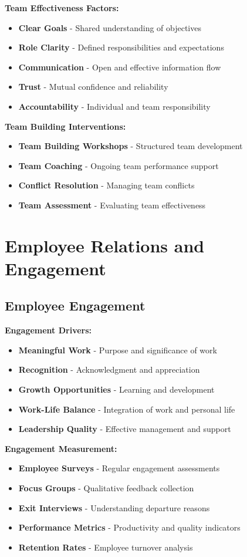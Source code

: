 \documentclass[12pt]{article}
\begin{document}
\textbf{Team Effectiveness Factors:}
\begin{itemize}
    \item \textbf{Clear Goals} - Shared understanding of objectives
    \item \textbf{Role Clarity} - Defined responsibilities and expectations
    \item \textbf{Communication} - Open and effective information flow
    \item \textbf{Trust} - Mutual confidence and reliability
    \item \textbf{Accountability} - Individual and team responsibility
\end{itemize}

\textbf{Team Building Interventions:}
\begin{itemize}
    \item \textbf{Team Building Workshops} - Structured team development
    \item \textbf{Team Coaching} - Ongoing team performance support
    \item \textbf{Conflict Resolution} - Managing team conflicts
    \item \textbf{Team Assessment} - Evaluating team effectiveness
\end{itemize}

\section{Employee Relations and Engagement}

\subsection{Employee Engagement}

\textbf{Engagement Drivers:}
\begin{itemize}
    \item \textbf{Meaningful Work} - Purpose and significance of work
    \item \textbf{Recognition} - Acknowledgment and appreciation
    \item \textbf{Growth Opportunities} - Learning and development
    \item \textbf{Work-Life Balance} - Integration of work and personal life
    \item \textbf{Leadership Quality} - Effective management and support
\end{itemize}

\textbf{Engagement Measurement:}
\begin{itemize}
    \item \textbf{Employee Surveys} - Regular engagement assessments
    \item \textbf{Focus Groups} - Qualitative feedback collection
    \item \textbf{Exit Interviews} - Understanding departure reasons
    \item \textbf{Performance Metrics} - Productivity and quality indicators
    \item \textbf{Retention Rates} - Employee turnover analysis
\end{itemize}
\end{document}
